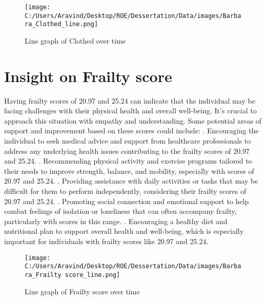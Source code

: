 \documentclass[10pt, a4paper]{article}%
\begin{document}
\begin{figure}[H]%
\centering%
\texttt{[image: C:/Users/Aravind/Desktop/ROE/Dessertation/Data/images/Barbara\_Clothed\_line.png]}%
\caption{Line graph of Clothed over time}%
\end{figure}

%
\section{Insight on Frailty score}%
\label{sec:InsightonFrailtyscore}%
Having frailty scores of 20.97 and 25.24 can indicate that the individual may be facing challenges with their physical health and overall well{-}being. It's crucial to approach this situation with empathy and understanding.\newline%
\newline%
Some potential areas of support and improvement based on these scores could include:\newline%
. Encouraging the individual to seek medical advice and support from healthcare professionals to address any underlying health issues contributing to the frailty scores of 20.97 and 25.24.\newline%
. Recommending physical activity and exercise programs tailored to their needs to improve strength, balance, and mobility, especially with scores of 20.97 and 25.24.\newline%
. Providing assistance with daily activities or tasks that may be difficult for them to perform independently, considering their frailty scores of 20.97 and 25.24.\newline%
. Promoting social connection and emotional support to help combat feelings of isolation or loneliness that can often accompany frailty, particularly with scores in this range.\newline%
. Encouraging a healthy diet and nutritional plan to support overall health and well{-}being, which is especially important for individuals with frailty scores like 20.97 and 25.24.%


\begin{figure}[H]%
\centering%
\texttt{[image: C:/Users/Aravind/Desktop/ROE/Dessertation/Data/images/Barbara\_Frailty score\_line.png]}%
\caption{Line graph of Frailty score over time}%
\end{figure}
\end{document}
